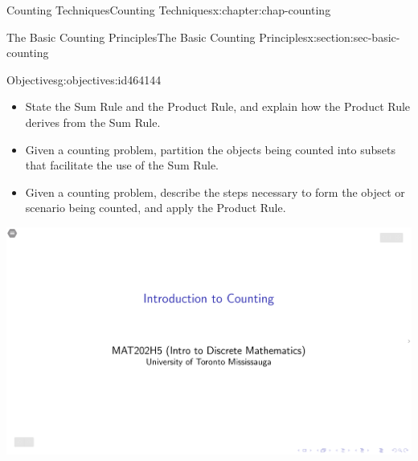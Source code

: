 \documentclass[oneside,10pt,]{book}
\numberwithin{equation}{section}
\newlength{\qrsize}
\newlength{\previewwidth}
\begin{document}
\begin{chapterptx}{Counting Techniques}{}{Counting Techniques}{}{}{x:chapter:chap-counting}
%
%
\typeout{************************************************}
\typeout{************************************************}
%
\begin{sectionptx}{The Basic Counting Principles}{}{The Basic Counting Principles}{}{}{x:section:sec-basic-counting}
\begin{objectives}{Objectives}{g:objectives:id464144}
%
\begin{itemize}[label=\textbullet]
\item{}State the Sum Rule and the Product Rule, and explain how the Product Rule derives from the Sum Rule.%
\item{}Given a counting problem, partition the objects being counted into subsets that facilitate the use of the Sum Rule.%
\item{}Given a counting problem, describe the steps necessary to form the object or scenario being counted, and apply the Product Rule.%
\end{itemize}
\end{objectives}
\begin{sidebyside}{1}{0}{0}{0}%
\begin{sbspanel}{1}%
\setlength{\qrsize}{9em}
\setlength{\previewwidth}{\linewidth}
\addtolength{\previewwidth}{-\qrsize}
\begin{tcbraster}[raster columns=2, raster column skip=1pt, raster halign=center, raster force size=false, raster left skip=0pt, raster right skip=0pt]%
\begin{tcolorbox}[previewstyle, width=\previewwidth]%
\includegraphics[width=0.80\linewidth,height=\qrsize,keepaspectratio]{images/01-thumb.png}%
\end{tcolorbox}%
\begin{tcolorbox}[qrstyle]%
{\hypersetup{urlcolor=black}}%

\end{tcolorbox}
\end{tcbraster}
\end{sbspanel}
\end{sidebyside}
\end{sectionptx}
\end{chapterptx}
\end{document}
